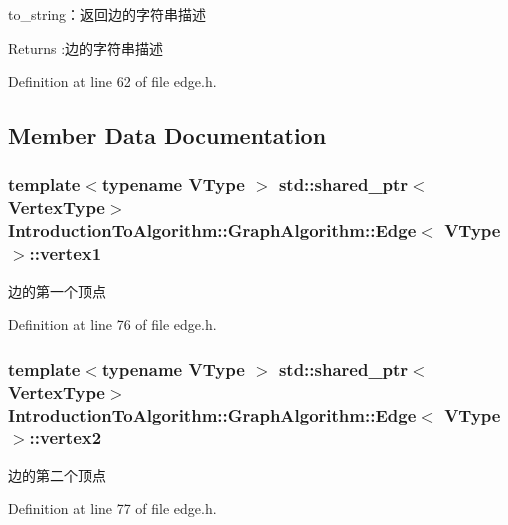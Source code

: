 to\+\_\+string：返回边的字符串描述 

\begin{DoxyReturn}{Returns}
\+:边的字符串描述 
\end{DoxyReturn}


Definition at line 62 of file edge.\+h.



\subsection{Member Data Documentation}
\hypertarget{struct_introduction_to_algorithm_1_1_graph_algorithm_1_1_edge_a634535a3f12be42c3c6ffb6d3c604fb7}{}
\subsubsection[{vertex1}]{\setlength{\rightskip}{0pt plus 5cm}template$<$typename V\+Type $>$ std\+::shared\+\_\+ptr$<${\bf Vertex\+Type}$>$ {\bf Introduction\+To\+Algorithm\+::\+Graph\+Algorithm\+::\+Edge}$<$ V\+Type $>$\+::vertex1}\label{struct_introduction_to_algorithm_1_1_graph_algorithm_1_1_edge_a634535a3f12be42c3c6ffb6d3c604fb7}
边的第一个顶点 

Definition at line 76 of file edge.\+h.

\hypertarget{struct_introduction_to_algorithm_1_1_graph_algorithm_1_1_edge_a762ca9f6ad5abb1adf8b7e1319ea3b52}{}
\subsubsection[{vertex2}]{\setlength{\rightskip}{0pt plus 5cm}template$<$typename V\+Type $>$ std\+::shared\+\_\+ptr$<${\bf Vertex\+Type}$>$ {\bf Introduction\+To\+Algorithm\+::\+Graph\+Algorithm\+::\+Edge}$<$ V\+Type $>$\+::vertex2}\label{struct_introduction_to_algorithm_1_1_graph_algorithm_1_1_edge_a762ca9f6ad5abb1adf8b7e1319ea3b52}
边的第二个顶点 

Definition at line 77 of file edge.\+h.

